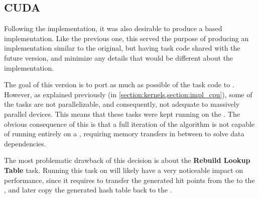\documentclass[main.tex]{subfiles}
\begin{document}
\subsection{CUDA} \label{section:impl_cuda}

Following the \cpu implementation, it was also desirable to produce a \cuda based implementation. Like the previous one, this served the purpose of producing an implementation similar to the original, but having task code shared with the future \starpu version, and minimize any details that would be different about the implementation.

The goal of this version is to port as much as possible of the \cpu task code to \cuda. However, as explained previously (in \cref{section:kernels,section:impl_cpu}), some of the tasks are not parallelizable, and consequently, not adequate to massively parallel devices. This means that these tasks were kept running on the \cpu. The obvious consequence of this is that a full iteration of the algorithm is not capable of running entirely on a \gpu, requiring memory transfers in between to solve data dependencies.

The most problematic drawback of this decision is about the \textbf{Rebuild Lookup Table} task. Running this task on \cpu will likely have a very noticeable impact on performance, since it requires to transfer the generated hit points from the \gpu to the \cpu, and later copy the generated hash table back to the \gpu.
\end{document}
